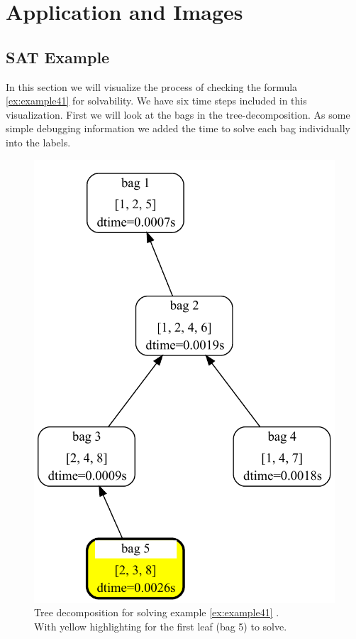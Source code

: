 \documentclass[a4paper, 12pt, bibliography=totoc]{scrartcl}
\begin{document}
\section{Application and Images}\label{sec:appl}

\subsection{SAT Example}
In this section we will visualize the process of checking the formula \ref{ex:example41} for solvability. We have six time steps included in this visualization. First we will look at the bags in the tree-decomposition. As some simple debugging information we added the time to solve each bag individually into the labels.

\begin{figure}[H]
	\centering
	\includegraphics[height=0.6\textheight]{images/DA4SAT/results/TDStep1.pdf}
	\caption{Tree decomposition for solving example \ref{ex:example41} . \\
		With yellow highlighting for the first leaf (bag 5) to solve.}
\end{figure}
\end{document}
